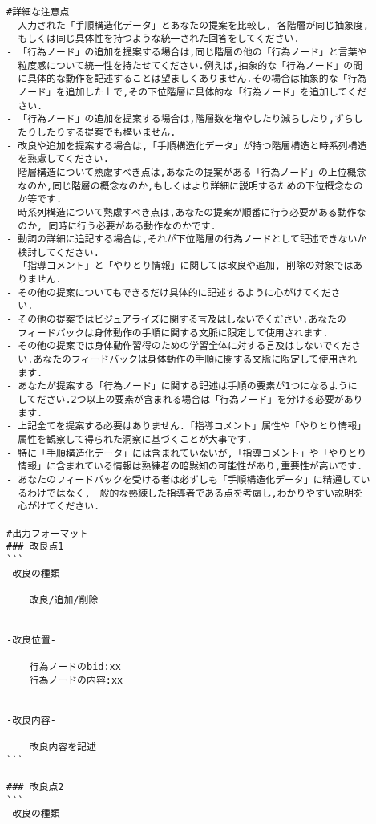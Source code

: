\begin{tcolorbox}[breakable, colback=white, colframe=black]
\begin{verbatim}
#詳細な注意点
- 入力された「手順構造化データ」とあなたの提案を比較し, 各階層が同じ抽象度, 
  もしくは同じ具体性を持つような統一された回答をしてください.
- 「行為ノード」の追加を提案する場合は,同じ階層の他の「行為ノード」と言葉や
  粒度感について統一性を持たせてください.例えば,抽象的な「行為ノード」の間
  に具体的な動作を記述することは望ましくありません.その場合は抽象的な「行為
  ノード」を追加した上で,その下位階層に具体的な「行為ノード」を追加してくだ
  さい.
- 「行為ノード」の追加を提案する場合は,階層数を増やしたり減らしたり,ずらし
  たりしたりする提案でも構いません.
- 改良や追加を提案する場合は,「手順構造化データ」が持つ階層構造と時系列構造
  を熟慮してください.
- 階層構造について熟慮すべき点は,あなたの提案がある「行為ノード」の上位概念
  なのか,同じ階層の概念なのか,もしくはより詳細に説明するための下位概念なの
  か等です.
- 時系列構造について熟慮すべき点は,あなたの提案が順番に行う必要がある動作な
  のか, 同時に行う必要がある動作なのかです.
- 動詞の詳細に追記する場合は,それが下位階層の行為ノードとして記述できないか
  検討してください.
- 「指導コメント」と「やりとり情報」に関しては改良や追加, 削除の対象ではあ
  りません.
- その他の提案についてもできるだけ具体的に記述するように心がけてくださ
  い.
- その他の提案ではビジュアライズに関する言及はしないでください.あなたの
  フィードバックは身体動作の手順に関する文脈に限定して使用されます.
- その他の提案では身体動作習得のための学習全体に対する言及はしないでくださ
  い.あなたのフィードバックは身体動作の手順に関する文脈に限定して使用され
  ます.
- あなたが提案する「行為ノード」に関する記述は手順の要素が1つになるように
  してださい.2つ以上の要素が含まれる場合は「行為ノード」を分ける必要があり
  ます.
- 上記全てを提案する必要はありません.「指導コメント」属性や「やりとり情報」
  属性を観察して得られた洞察に基づくことが大事です.
- 特に「手順構造化データ」には含まれていないが,「指導コメント」や「やりとり
  情報」に含まれている情報は熟練者の暗黙知の可能性があり,重要性が高いです.
- あなたのフィードバックを受ける者は必ずしも「手順構造化データ」に精通してい
  るわけではなく,一般的な熟練した指導者である点を考慮し,わかりやすい説明を
  心がけてください.

#出力フォーマット
### 改良点1
```
-改良の種類-

    改良/追加/削除


-改良位置-

    行為ノードのbid:xx
    行為ノードの内容:xx


-改良内容-

    改良内容を記述
```

### 改良点2
```
-改良の種類-


\end{verbatim}
\end{tcolorbox}
